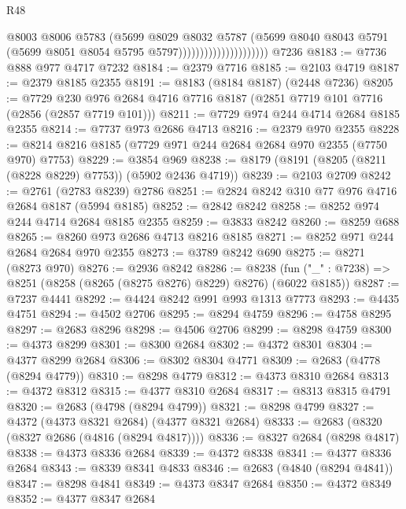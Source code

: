 \begin{lexlean}{R48}
\begin{coremodule}
                                        @8003
                                        @8006
                                        @5783
                                        (@5699
                                          @8029
                                          @8032
                                          @5787
                                          (@5699
                                            @8040
                                            @8043
                                            @5791
                                            (@5699 @8051 @8054 @5795 @5797)))))))))))))))))))))
    @7236
@8183 := @7736 @888 @977 @4717 @7232
@8184 := @2379 @7716
@8185 := @2103 @4719
@8187 := @2379 @8185 @2355
@8191 := @8183 (@8184 @8187) (@2448 @7236)
@8205 := @7729 @230 @976 @2684 @4716 @7716 @8187 (@2851 @7719 @101 @7716 (@2856 (@2857 @7719 @101)))
@8211 := @7729 @974 @244 @4714 @2684 @8185 @2355
@8214 := @7737 @973 @2686 @4713
@8216 := @2379 @970 @2355
@8228 := @8214 @8216 @8185 (@7729 @971 @244 @2684 @2684 @970 @2355 (@7750 @970) @7753)
@8229 := @3854 @969
@8238 := @8179 (@8191 (@8205 (@8211 (@8228 @8229) @7753)) (@5902 @2436 @4719))
@8239 := @2103 @2709
@8242 := @2761 (@2783 @8239) @2786
@8251 := @2824 @8242 @310 @77 @976 @4716 @2684 @8187 (@5994 @8185)
@8252 := @2842 @8242
@8258 := @8252 @974 @244 @4714 @2684 @8185 @2355
@8259 := @3833 @8242
@8260 := @8259 @688
@8265 := @8260 @973 @2686 @4713 @8216 @8185
@8271 := @8252 @971 @244 @2684 @2684 @970 @2355
@8273 := @3789 @8242 @690
@8275 := @8271 (@8273 @970)
@8276 := @2936 @8242
@8286 := @8238 (fun ("_" : @7238) => @8251 (@8258 (@8265 (@8275 @8276) @8229) @8276) (@6022 @8185))
@8287 := @7237 @4441
@8292 := @4424 @8242 @991 @993 @1313 @7773
@8293 := @4435 @4751
@8294 := @4502 @2706
@8295 := @8294 @4759
@8296 := @4758 @8295
@8297 := @2683 @8296
@8298 := @4506 @2706
@8299 := @8298 @4759
@8300 := @4373 @8299
@8301 := @8300 @2684
@8302 := @4372 @8301
@8304 := @4377 @8299 @2684
@8306 := @8302 @8304 @4771
@8309 := @2683 (@4778 (@8294 @4779))
@8310 := @8298 @4779
@8312 := @4373 @8310 @2684
@8313 := @4372 @8312
@8315 := @4377 @8310 @2684
@8317 := @8313 @8315 @4791
@8320 := @2683 (@4798 (@8294 @4799))
@8321 := @8298 @4799
@8327 := @4372 (@4373 @8321 @2684) (@4377 @8321 @2684)
@8333 := @2683 (@8320 (@8327 @2686 (@4816 (@8294 @4817))))
@8336 := @8327 @2684 (@8298 @4817)
@8338 := @4373 @8336 @2684
@8339 := @4372 @8338
@8341 := @4377 @8336 @2684
@8343 := @8339 @8341 @4833
@8346 := @2683 (@4840 (@8294 @4841))
@8347 := @8298 @4841
@8349 := @4373 @8347 @2684
@8350 := @4372 @8349
@8352 := @4377 @8347 @2684

\end{coremodule}
\end{lexlean}

